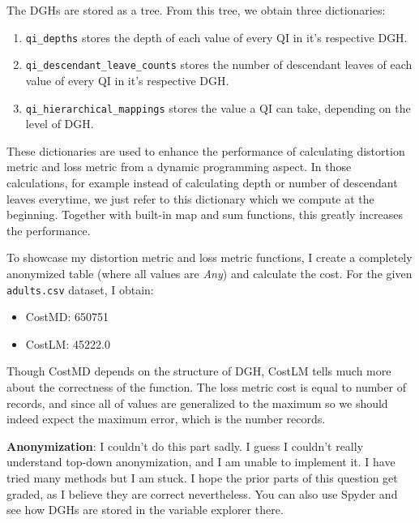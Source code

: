 \documentclass[12pt,reqno]{amsart}
\newcommand{\code}[1]{\texttt{#1}}
\begin{document}
The DGHs are stored as a tree. From this tree, we obtain three dictionaries:
\begin{enumerate}
	\item \code{qi\_depths} stores the depth of each value of every QI in it's respective DGH.
	\item \code{qi\_descendant\_leave\_counts} stores the number of descendant leaves of each value of every QI in it's respective DGH. 
	\item \code{qi\_hierarchical\_mappings} stores the value a QI can take, depending on the level of DGH.
\end{enumerate}
These dictionaries are used to enhance the performance of calculating distortion metric and loss metric from a dynamic programming aspect. In those calculations, for example instead of calculating depth or number of descendant leaves everytime, we just refer to this dictionary which we compute at the beginning. Together with built-in map and sum functions, this greatly increases the performance.

To showcase my distortion metric and loss metric functions, I create a completely anonymized table (where all values are \textit{Any}) and calculate the cost. For the given \code{adults.csv} dataset, I obtain:
\begin{itemize}
	\item CostMD: 650751
	\item CostLM: 45222.0
\end{itemize}
Though CostMD depends on the structure of DGH, CostLM tells much more about the correctness of the function. The loss metric cost is equal to number of records, and since all of values are generalized to the maximum so we should indeed expect the maximum error, which is the number records.

\textbf{Anonymization}: I couldn't do this part sadly. I guess I couldn't really understand top-down anonymization, and I am unable to implement it. I have tried many methods but I am stuck. I hope the prior parts of this question get graded, as I believe they are correct nevertheless. You can also use Spyder and see how DGHs are stored in the variable explorer there.
\end{document}
